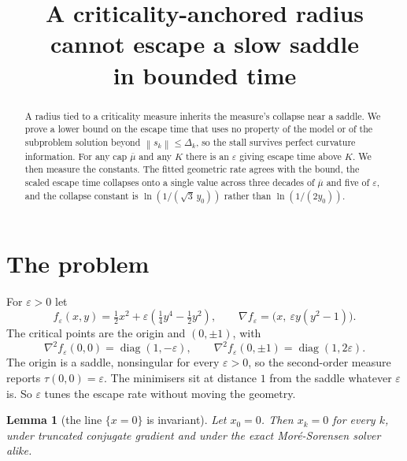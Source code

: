 \documentclass[11pt,a4paper]{article}
\title{A criticality-anchored radius cannot escape a slow saddle\\ in bounded time}
\author{}
\date{}
\providecommand{\norm}[1]{\left \lVert #1 \right \rVert}
\newtheorem{lemma}[proposition]{Lemma}
\theoremstyle{definition}
\theoremstyle{remark}
\begin{document}
\maketitle

\begin{abstract}
A radius tied to a criticality measure inherits the measure's collapse near a
saddle. We prove a lower bound on the escape time that uses no property of the
model or of the subproblem solution beyond $\norm{s_k} \leq \Delta_k$, so the
stall survives perfect curvature information. For any cap $\overline{\mu}$ and
any $K$ there is an $\varepsilon$ giving escape time above $K$. We then measure
the constants. The fitted geometric rate agrees with the bound, the scaled
escape time collapses onto a single value across three decades of
$\overline{\mu}$ and five of $\varepsilon$, and the collapse constant is
$\ln(1/(\sqrt3\,y_0))$ rather than $\ln(1/(2y_0))$.
\end{abstract}

\section{The problem}\label{sec: problem}

For $\varepsilon > 0$ let
\begin{equation}
  f_\varepsilon(x,y) = \tfrac12 x^2
      + \varepsilon\left(\tfrac14 y^4 - \tfrac12 y^2\right) ,
  \qquad
  \nabla f_\varepsilon = \bigl(x,\ \varepsilon y(y^2-1)\bigr) .
  \label{eqn: f}
\end{equation}
The critical points are the origin and $(0,\pm1)$, with
\begin{equation}
  \nabla^2 f_\varepsilon(0,0) = \operatorname{diag}(1,-\varepsilon) ,
  \qquad
  \nabla^2 f_\varepsilon(0,\pm1) = \operatorname{diag}(1,2\varepsilon) .
  \label{eqn: hessians}
\end{equation}
The origin is a saddle, nonsingular for every $\varepsilon > 0$, so the
second-order measure reports $\tau(0,0) = \varepsilon$. The minimisers sit at
distance $1$ from the saddle whatever $\varepsilon$ is. So $\varepsilon$ tunes
the escape rate without moving the geometry.

\begin{lemma}[the line $\{x=0\}$ is invariant]\label{prop: invariant}
  Let $x_0 = 0$. Then $x_k = 0$ for every $k$, under truncated conjugate
  gradient and under the exact Mor\'e-Sorensen solver alike.
\end{lemma}
\end{document}

